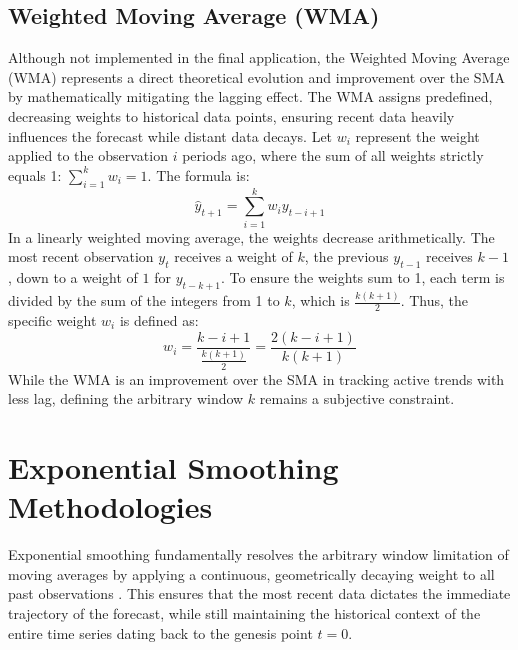 \subsection{Weighted Moving Average (WMA)}
Although not implemented in the final application, the Weighted Moving Average (WMA) represents a direct theoretical evolution and improvement over the SMA by mathematically mitigating the lagging effect. The WMA assigns predefined, decreasing weights to historical data points, ensuring recent data heavily influences the forecast while distant data decays. Let $w_i$ represent the weight applied to the observation $i$ periods ago, where the sum of all weights strictly equals 1: $\sum_{i=1}^{k} w_i = 1$. The formula is:
\begin{equation}
    \hat{y}_{t+1} = \sum_{i=1}^{k} w_i y_{t-i+1}
\end{equation}
In a linearly weighted moving average, the weights decrease arithmetically. The most recent observation $y_t$ receives a weight of $k$, the previous $y_{t-1}$ receives $k-1$, down to a weight of $1$ for $y_{t-k+1}$. To ensure the weights sum to 1, each term is divided by the sum of the integers from 1 to $k$, which is $\frac{k(k+1)}{2}$. Thus, the specific weight $w_i$ is defined as:
\begin{equation}
    w_i = \frac{k - i + 1}{\frac{k(k+1)}{2}} = \frac{2(k - i + 1)}{k(k+1)}
\end{equation}
While the WMA is an improvement over the SMA in tracking active trends with less lag, defining the arbitrary window $k$ remains a subjective constraint.

\section{Exponential Smoothing Methodologies}
Exponential smoothing fundamentally resolves the arbitrary window limitation of moving averages by applying a continuous, geometrically decaying weight to all past observations \cite{Hyndman2008}. This ensures that the most recent data dictates the immediate trajectory of the forecast, while still maintaining the historical context of the entire time series dating back to the genesis point $t=0$.

